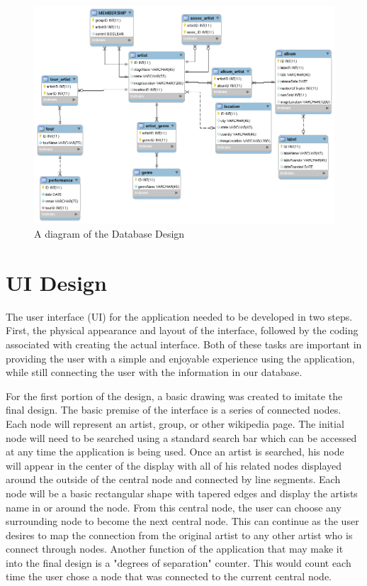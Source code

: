 \documentclass{sig-alternate}
\begin{document}
\begin{figure}[ht!]
\centering
\includegraphics[width=15cm]{ArtistDB.png}
\caption{A diagram of the Database Design}
\label{ArtistDB}
\end{figure}

\section{UI Design}
\label{ui design}

The user interface (UI) for the application needed to be developed in two steps. First, the physical appearance 
and layout of the interface, followed by the coding associated with creating the actual interface. Both of these 
tasks are important in providing the user with a simple and enjoyable experience using the application, while 
still connecting the user with the information in our database. 

For the first portion of the design, a basic drawing was created to imitate the final design. The basic premise 
of the interface is a series of connected nodes. Each node will represent an artist, group, or other wikipedia 
page. The initial node will need to be searched using a standard search bar which can be accessed at any time 
the application is being used. Once an artist is searched, his node will appear in the center of the display 
with all of his related nodes displayed around the outside of the central node and connected by line segments. 
Each node will be a basic rectangular shape with tapered edges and display the artists name in or around the node. 
From this central node, the user can choose any surrounding node to become the next central node. This can continue 
as the user desires to map the connection from the original artist to any other artist who is connect through nodes.
Another function of the application that may make it into the final design is a "degrees of separation" counter. 
This would count each time the user chose a node that was connected to the current central node. 
\end{document}
